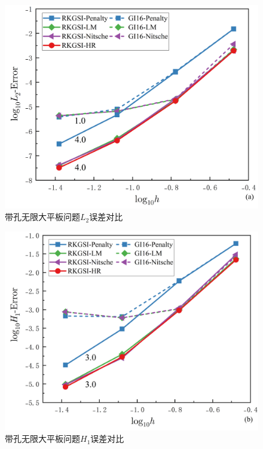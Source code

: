 \begin{figure}[H]
    \centering
    \includegraphics[scale=0.5]{figure/EHR/hole/L2.png}
    \caption{带孔无限大平板问题$L_2$误差对比}\label{HL2}
\end{figure}
\newpage
\begin{figure}[H]
    \centering
    \includegraphics[scale=0.5]{figure/EHR/hole/H1.png}
    \caption{带孔无限大平板问题$H_1$误差对比}\label{HH1}
\end{figure}
